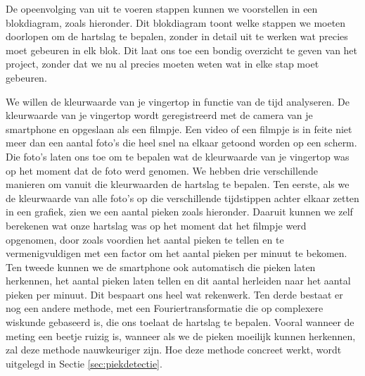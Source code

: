 
De opeenvolging van uit te voeren stappen kunnen we voorstellen in een blokdiagram, zoals hieronder. Dit blokdiagram toont welke stappen we moeten doorlopen om de hartslag te bepalen, zonder in detail uit te werken wat precies moet gebeuren in elk blok. Dit laat ons toe een bondig overzicht te geven van het project, zonder dat we nu al precies moeten weten wat in elke stap moet gebeuren.

We willen de kleurwaarde van je vingertop in functie van de tijd analyseren. 
De kleurwaarde van je vingertop wordt geregistreerd met de camera van je smartphone en opgeslaan als een filmpje.
Een video of een filmpje is in feite niet meer dan een aantal foto's die heel snel na elkaar getoond worden op een scherm.
Die foto's laten ons toe om te bepalen wat de kleurwaarde van je vingertop was op het moment dat de foto werd genomen.
We hebben drie verschillende manieren om vanuit die kleurwaarden de hartslag te bepalen.
Ten eerste, als we de kleurwaarde van alle foto's op die verschillende tijdstippen achter elkaar zetten in een grafiek, zien we een aantal pieken zoals hieronder. 
Daaruit kunnen we zelf berekenen wat onze hartslag was op het moment dat het filmpje werd opgenomen, door zoals voordien het aantal pieken te tellen en te vermenigvuldigen met een factor om het aantal pieken per minuut te bekomen.
Ten tweede kunnen we de smartphone ook automatisch die pieken laten herkennen, het aantal pieken laten tellen en dit aantal herleiden naar het aantal pieken per minuut.
Dit bespaart ons heel wat rekenwerk.
Ten derde bestaat er nog een andere methode, met een Fouriertransformatie die op complexere wiskunde gebaseerd is, die ons toelaat de hartslag te bepalen. 
Vooral wanneer de meting een beetje ruizig is, wanneer als we de pieken moeilijk kunnen herkennen, zal deze methode nauwkeuriger zijn.
Hoe deze methode concreet werkt, wordt uitgelegd in Sectie \ref{sec:piekdetectie}.


